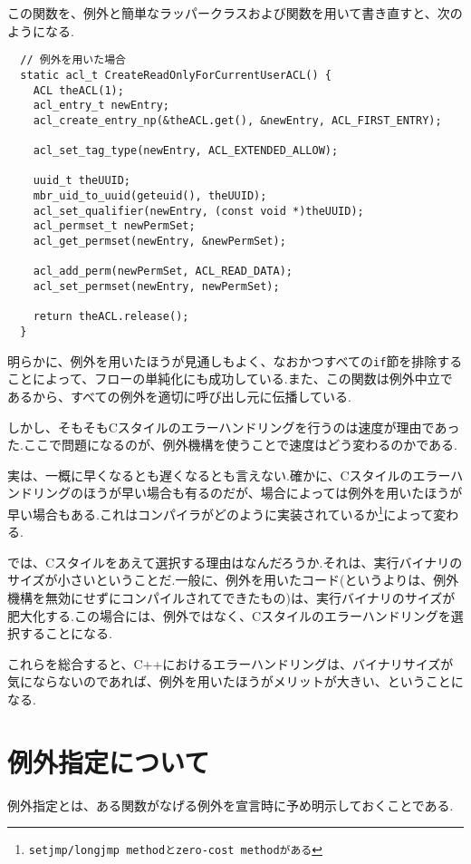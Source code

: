\documentclass[a4j,11pt,openright]{jsbook}
\begin{document}
この関数を、例外と簡単なラッパークラスおよび関数を用いて書き直すと、次のようになる.

\begin{verbatim}
  // 例外を用いた場合
  static acl_t CreateReadOnlyForCurrentUserACL() {
    ACL theACL(1);
    acl_entry_t newEntry;
    acl_create_entry_np(&theACL.get(), &newEntry, ACL_FIRST_ENTRY);
    
    acl_set_tag_type(newEntry, ACL_EXTENDED_ALLOW);
    
    uuid_t theUUID;
    mbr_uid_to_uuid(geteuid(), theUUID);
    acl_set_qualifier(newEntry, (const void *)theUUID);
    acl_permset_t newPermSet;
    acl_get_permset(newEntry, &newPermSet);
    
    acl_add_perm(newPermSet, ACL_READ_DATA);
    acl_set_permset(newEntry, newPermSet);
    
    return theACL.release();
  }
\end{verbatim}

明らかに、例外を用いたほうが見通しもよく、なおかつすべての\verb|if|節を排除することによって、フローの単純化にも成功している.また、この関数は例外中立であるから、すべての例外を適切に呼び出し元に伝播している.

しかし、そもそもCスタイルのエラーハンドリングを行うのは速度が理由であった.ここで問題になるのが、例外機構を使うことで速度はどう変わるのかである.

実は、一概に早くなるとも遅くなるとも言えない.確かに、Cスタイルのエラーハンドリングのほうが早い場合も有るのだが、場合によっては例外を用いたほうが早い場合もある.これはコンパイラがどのように実装されているか\footnote{\texttt{setjmp/longjmp methodとzero-cost methodがある}}によって変わる.

では、Cスタイルをあえて選択する理由はなんだろうか.それは、実行バイナリのサイズが小さいということだ.一般に、例外を用いたコード(というよりは、例外機構を無効にせずにコンパイルされてできたもの)は、実行バイナリのサイズが肥大化する.この場合には、例外ではなく、Cスタイルのエラーハンドリングを選択することになる.

これらを総合すると、C++におけるエラーハンドリングは、バイナリサイズが気にならないのであれば、例外を用いたほうがメリットが大きい、ということになる.

\section{例外指定について}

例外指定とは、ある関数がなげる例外を宣言時に予め明示しておくことである.
\end{document}
